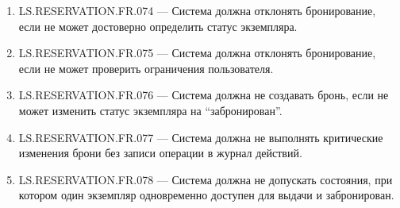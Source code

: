 \documentclass[12pt,a4paper]{article}
\begin{document}
\begin{enumerate}
		\item LS.RESERVATION.FR.074 --- Система должна отклонять бронирование, если не
		может достоверно определить статус экземпляра.
		
		\item LS.RESERVATION.FR.075 --- Система должна отклонять бронирование, если не
		может проверить ограничения пользователя.
		
		\item LS.RESERVATION.FR.076 --- Система должна не создавать бронь, если не может
		изменить статус экземпляра на ``забронирован''.
		
		\item LS.RESERVATION.FR.077 --- Система должна не выполнять критические
		изменения брони без записи операции в журнал действий.
		
		\item LS.RESERVATION.FR.078 --- Система должна не допускать состояния, при
		котором один экземпляр одновременно доступен для выдачи и забронирован.
	\end{enumerate}
	
\end{document}

